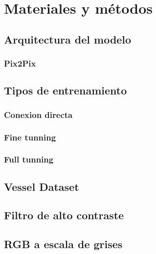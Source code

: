 \section{Materiales y métodos}





\subsection{Arquitectura del modelo}




\subsubsection{Pix2Pix}

\subsection{Tipos de entrenamiento}

\subsubsection{Conexion directa}

\subsubsection{Fine tunning}

\subsubsection{Full tunning}

\subsection{Vessel Dataset}

\subsection{Filtro de alto contraste}

\subsection{RGB a escala de grises}